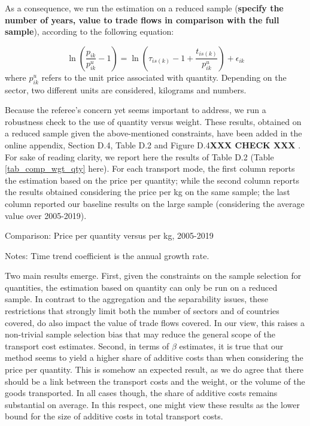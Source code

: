 \documentclass[a4paper,11pt]{article}
\begin{document}
\begin{itemize}
\begin{enumerate}
\begin{table}[htbp]
As a consequence, we run the estimation on a reduced sample (\textbf{specify the number of years, value to trade flows in comparison with the full sample}), according to the following equation:

\begin{equation}
\ln\left(\frac{p_{ik}}{p^u_{ik}}-1 \right)= \ln \left(\tau_{is(k)} -1+\frac{t_{is(k)} }{p^u_{ik}} \right) + \epsilon_{ik} \label{eq:model_IetA}
\end{equation}
\noindent where $p^u_{ik}$ refers to the unit price associated with quantity. Depending on the sector, two different units are considered, kilograms and numbers.


Because the referee's concern yet seems important to address, we run a robustness check to the use of quantity versus weight. These results, obtained on a reduced sample given the above-mentioned constraints, have been added in the online appendix, Section D.4, Table D.2 and Figure D.4\textbf{XXX CHECK XXX }. For sake of reading clarity, we report here the results of Table D.2 (Table \ref{tab_comp_wgt_qty} here). For each transport mode, the first column reports the estimation based on the price per quantity; while the second column reports the results obtained considering the price per kg on the same sample; the last column reported our baseline results on the large sample (considering the average value over 2005-2019).

\begin{table}[htbp]
	\caption{Comparison: Price per quantity versus per kg, 2005-2019}
	\begin{center}		
		
	
{\parbox[l]{12cm}{ \vspace{4pt}\footnotesize{Notes: Time trend coefficient is the annual growth rate.}}}
\end{center}
	\label{tab_comp_wgt_qty}%
\end{table}%


Two main results emerge. First, given the constraints on the sample selection for quantities, the estimation based on quantity can only be run on a reduced sample. In contrast to the aggregation and the separability issues, these restrictions that strongly limit both the number of sectors and of countries covered, do also impact the value of trade flows covered. In our view, this raises a non-trivial sample selection bias that may reduce the general scope of the transport cost estimates. Second, in terms of $\beta$ estimates, it is true that our method seems to yield a higher share of additive costs than when considering the price per quantity. This is somehow an expected result, as we do agree that there should be a link between the transport costs and the weight, or the volume of the goods transported. In all cases though, the share of additive costs remains substantial on average. In this respect, one might view these results as the lower bound for the size of additive costs in total transport costs.\smallskip



\end{table}
\end{enumerate}
\end{itemize}
\end{document}
